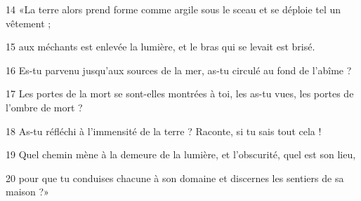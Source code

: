 
14 «La terre alors prend forme comme argile sous le sceau et se déploie tel un vêtement ;

15 aux méchants est enlevée la lumière, et le bras qui se levait est brisé.

16 Es-tu parvenu jusqu’aux sources de la mer, as-tu circulé au fond de l’abîme ?

17 Les portes de la mort se sont-elles montrées à toi, les as-tu vues, les portes de l’ombre de mort ?

18 As-tu réfléchi à l’immensité de la terre ? Raconte, si tu sais tout cela !

19 Quel chemin mène à la demeure de la lumière, et l’obscurité, quel est son lieu,

20 pour que tu conduises chacune à son domaine et discernes les sentiers de sa maison ?»